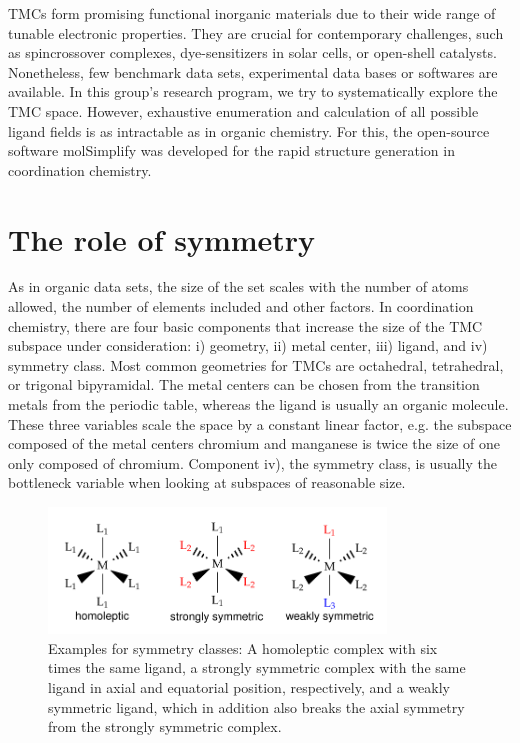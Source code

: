 \documentclass{article}
\begin{document}
TMCs form promising functional inorganic materials due to their wide range of tunable electronic properties. They are crucial for contemporary challenges, such as spincrossover complexes,\cite{letard2004,halcrow2011,ashley2017} dye-sensitizers in solar cells,\cite{bignozzi2013} or open-shell catalysts.\cite{harvey2003} Nonetheless, few benchmark data sets, experimental data bases or softwares are available. In this group's research program, we try to systematically explore the TMC space.  However, exhaustive enumeration and calculation of all possible ligand fields is as intractable as in organic chemistry. For this, the open-source software molSimplify\cite{ioannidis2016} was developed for the rapid structure generation in coordination chemistry. 

\section{The role of symmetry}
As in organic data sets, the size of the set scales with the number of atoms allowed, the number of elements included and other factors. In coordination chemistry, there are four basic components that increase the size of the TMC subspace under consideration: i) geometry, ii) metal center, iii) ligand, and iv) symmetry class. Most common geometries for TMCs are octahedral, tetrahedral, or trigonal bipyramidal. The metal centers can be chosen from the transition metals from the periodic table, whereas the ligand is usually an organic molecule. These three variables scale the space by a constant linear factor, e.g. the subspace composed of the metal centers chromium and manganese is twice the size of one only composed of chromium. Component iv), the symmetry class, is usually the bottleneck variable when looking at subspaces of reasonable size.

\begin{figure}
	\includegraphics[width=0.8\textwidth]{img/symmetry_classes}
	\centering
	\caption{Examples for symmetry classes: A homoleptic complex with six times the same ligand, a strongly symmetric complex with the same ligand in axial and equatorial position, respectively, and a weakly symmetric ligand, which in addition also breaks the axial symmetry from the strongly symmetric complex.}
	\label{fig:sym-classes}
\end{figure}
\end{document}
